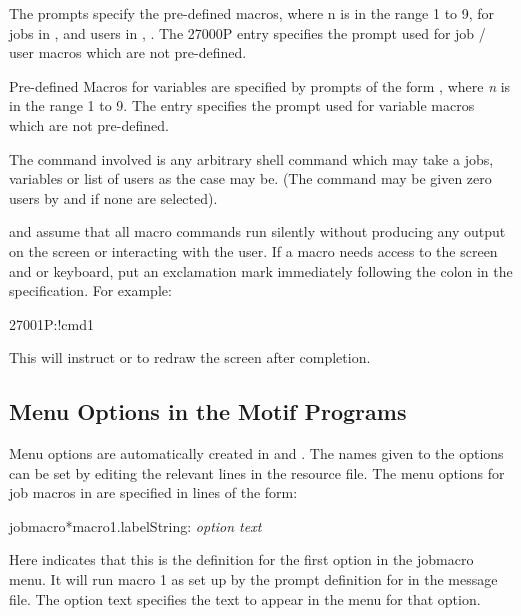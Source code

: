 The  prompts specify the pre-defined macros, where n is in the range 1 to 9, for jobs in \PrBtq{}, \PrXmbtq{} and users in
\PrBtuser{}, \PrXmbtuser{}. The 27000P entry specifies the prompt used for job / user macros which are not pre-defined.

Pre-defined Macros for variables are specified by prompts of the form , where \textit{n} is in the range 1 to 9.
The  entry specifies the prompt used for variable macros which are not pre-defined.

The command involved is any arbitrary shell command which may take a jobs, variables or list of users as the case may be. (The command may
be given zero users by \PrXmbtuser{} and \PrBtuser{} if none are selected).

\PrBtq{} and \PrBtuser{} assume that all macro commands run silently without producing any output on the screen or interacting with the user. If a macro needs access to the screen and or keyboard, put an exclamation mark immediately following the colon in the specification. For example:

\begin{expara}

27001P:!cmd1

\end{expara}

This will instruct \PrBtq{} or \PrBtuser{} to redraw the screen after completion.

\subsection{Menu Options in the Motif Programs}
Menu options are automatically created in \PrXmbtq{} and \PrXmbtuser{}. The names given to the options can
be set by editing the relevant lines in the resource file. The menu options for job macros in \PrXmbtq{} are specified in
lines of the form:

\begin{expara}

\XmbtqName*jobmacro*macro1.labelString: \textit{option text}

\end{expara}

Here  indicates that this is the definition for the first option in the jobmacro menu. It will run macro 1 as set
up by the prompt definition for  in the  message file. The option text
specifies the text to appear in the menu for that option.

